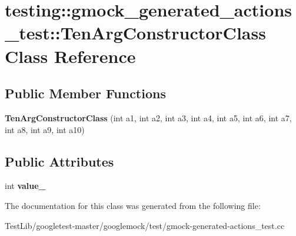 \hypertarget{classtesting_1_1gmock__generated__actions__test_1_1TenArgConstructorClass}{}\section{testing\+:\+:gmock\+\_\+generated\+\_\+actions\+\_\+test\+:\+:Ten\+Arg\+Constructor\+Class Class Reference}
\label{classtesting_1_1gmock__generated__actions__test_1_1TenArgConstructorClass}
\subsection*{Public Member Functions}
\begin{DoxyCompactItemize}
\item 
\mbox{\label{classtesting_1_1gmock__generated__actions__test_1_1TenArgConstructorClass_ac17a2190151616f986a193dfe0a03cb5}} 
{\bfseries Ten\+Arg\+Constructor\+Class} (int a1, int a2, int a3, int a4, int a5, int a6, int a7, int a8, int a9, int a10)
\end{DoxyCompactItemize}
\subsection*{Public Attributes}
\begin{DoxyCompactItemize}
\item 
\mbox{\label{classtesting_1_1gmock__generated__actions__test_1_1TenArgConstructorClass_ae3c388fd7e3cfbb95196712076a368ad}} 
int {\bfseries value\+\_\+}
\end{DoxyCompactItemize}


The documentation for this class was generated from the following file\+:\begin{DoxyCompactItemize}
\item 
Test\+Lib/googletest-\/master/googlemock/test/gmock-\/generated-\/actions\+\_\+test.\+cc\end{DoxyCompactItemize}
